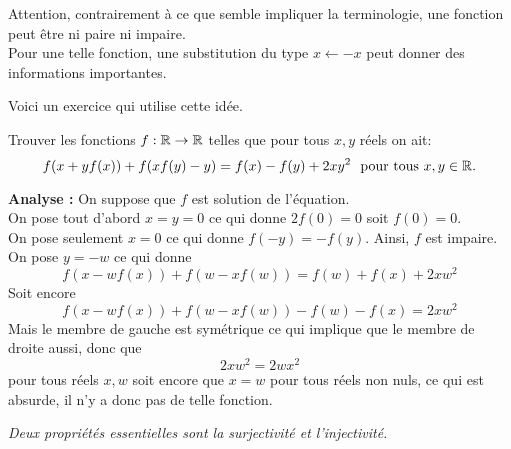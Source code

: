 \begin{rem}
Attention, contrairement à ce que semble impliquer la terminologie, une fonction peut être ni paire ni impaire.
\\
Pour une telle fonction, une substitution du type $x\gets-x$ peut donner des informations importantes.
\end{rem}

Voici un exercice qui utilise cette idée.



\begin{exo}[M]
Trouver les fonctions $f:\mathbb R\to \mathbb R$ telles que pour tous $x,y$ réels on ait:
$$f(x+yf(x)) +f(xf(y)-y) = f(x)-f(y)+2xy^2 \ \text{ pour tous } x, y \in \mathbb R.$$
\end{exo}
\begin{preuve}
\textbf{Analyse :} On suppose que $f$ est solution de l'équation.
\\
On pose tout d'abord $x=y=0$
ce qui donne $2f(0)=0$ soit $f(0)=0$.
\\
On pose seulement $x=0$ ce qui donne $f(-y)=-f(y)$. Ainsi, $f$ est impaire.
\\
On pose $y=-w$ ce qui donne $$f(x-wf(x))+f(w-xf(w))=f(w)+f(x)+2xw^2$$
Soit encore $$f(x-wf(x))+f(w-xf(w))-f(w)-f(x)=2xw^2$$
Mais le membre de gauche est symétrique ce qui implique que le membre de droite aussi, donc que $$2xw^2=2wx^2$$ pour tous réels $x,w$ soit encore que $x=w$ pour tous réels non nuls, ce qui est absurde, il n'y a donc pas de telle fonction.
\end{preuve}

\emph{Deux propriétés essentielles sont la surjectivité et l'injectivité.}

